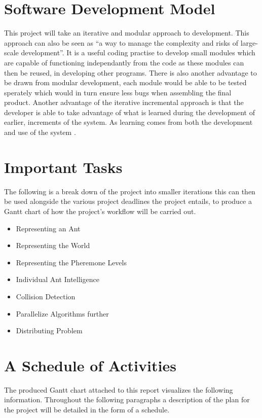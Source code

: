 \documentclass[main.tex]{subfiles}
\begin{document}
\section{Software Development Model}
This project will take an iterative and modular approach to development. This approach can also be seen as ``a way to manage the complexity and risks of large-scale development''\cite{Larman2003}.  It is a useful coding practise to develop small modules which are capable of functioning independantly from the code as these modules can then be reused, in developing other programs. There is also another advantage to be drawn from modular development, each module would be able to be tested sperately which would in turn ensure less bugs when assembling the final product. Another advantage of the iterative incremental approach is that the developer is able to take advantage of what is learned during the development of earlier, increments of the system. As learning comes from both the development and use of the system \cite{Larman2003}.

\section{Important Tasks}
The following is a break down of the project into smaller iterations this can then be used alongside the various project deadlines the project entails, to produce a Gantt chart of how the project's workflow will be carried out.
\begin{itemize}
	\item Representing an Ant
	\item Representing the World
	\item Representing the Pheremone Levels
	\item Individual Ant Intelligence
	\item Collision Detection
	\item Parallelize Algorithms further
	\item Distributing Problem
\end{itemize}

\section{A Schedule of Activities}
The produced Gantt chart attached to this report visualizes the following information. Throughout the following paragraphs a description of the plan for the project will be detailed in the form of a schedule. 
\end{document}
